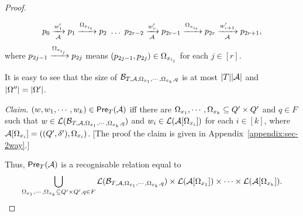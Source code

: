 \begin{proof}
\begin{itemize}
$$p_0 \xrightarrow[\mathcal{A}]{w'_1} p_1 \xrightarrow{\Omega_{x_{i_1}}} p_2\ \ldots\ p_{2r-2} \xrightarrow[\mathcal{A}]{w'_r}p_{2r-1} \xrightarrow{\Omega_{x_{i_r}}} p_{2r} \xrightarrow[\mathcal{A}]{w'_{r+1}} p_{2r+1},$$ 
where $p_{2j-1} \xrightarrow{\Omega_{x_{i_j}}} p_{2j}$ means $(p_{2j-1}, p_{2j}) \in \Omega_{x_{i_j}}$ for each $j \in [r]$.
\end{itemize}
%
%
It is easy to see that  the size of $\mathcal{B}_{T, \mathcal{A}, \Omega_{x_1}, \cdots, \Omega_{x_k}, q}$ is at most $|T||\mathcal{A}|$ and $|\Omega''| = |\Omega'|$.   

\smallskip
\noindent
\emph{Claim.} %
$(w, w_1,\cdots, w_k) \in \textsf{Pre}_{T}(\mathcal{A})$ iff there are $\Omega_{x_1}, \cdots, \Omega_{x_k} \subseteq Q' \times Q'$ and $q \in F$ such that $w \in \mathcal{L}(\mathcal{B}_{T, \mathcal{A}, \Omega_{x_1}, \cdots, \Omega_{x_k}, q})$ and $w_i \in \mathcal{L}(\mathcal{A}[\Omega_{x_i}])$ for each $i \in [k]$, where $\mathcal{A}[\Omega_{x_i}]=((Q', \delta'), \Omega_{x_i})$. [The proof the claim is given in Appendix~\ref{appendix:sec-2way}.]
\smallskip

Thus, $\textsf{Pre}_{T}(\mathcal{A})$ is a recognisable relation equal to
\[
\bigcup_{\Omega_{x_1}, \cdots, \Omega_{x_k} \subseteq Q' \times Q', q\in F} \mathcal{L}(\mathcal{B}_{T, \mathcal{A}, \Omega_{x_1}, \cdots, \Omega_{x_k},q}) \times \mathcal{L}(\mathcal{A}[\Omega_{x_1}]) \times \cdots  \times \mathcal{L}(\mathcal{A}[\Omega_{x_k}]).\]
%


\end{proof}
